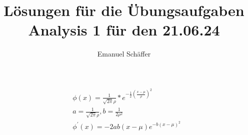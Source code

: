 \documentclass[a4paper, ngerman]{scrartcl}
\begin{document}
	\title{Lösungen für die Übungsaufgaben Analysis 1 für den 21.06.24}
	\author{Emanuel Schäffer}
	\maketitle
	
	\begin{align*}
		&\phi(x) = \frac{1}{\sqrt{2\pi}\rho}*e^{-\frac{1}{2}\left(\frac{x-\mu}{\rho}\right)^2}\\
		&a = \frac{1}{\sqrt{2\pi}\rho}, b = \frac{1}{2\rho^2}\\
		&\phi^\prime(x) = -2ab(x-\mu)e^{-b(x-\mu)^2}
	\end{align*}
\end{document}

